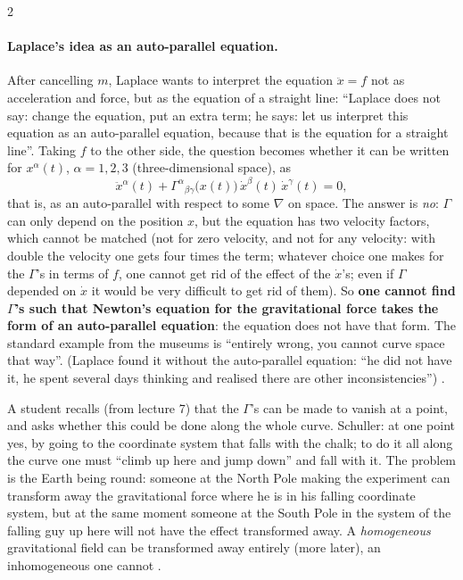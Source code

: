 \begin{paracol}{2}
\paragraph{Laplace's idea as an auto-parallel equation.} After cancelling $m$, Laplace wants to interpret the equation $\ddot x=f$ not as acceleration and force, but as the equation of a straight line: ``Laplace does not say: change the equation, put an extra term; he says: let us interpret this equation as an auto-parallel equation, because that is the equation for a straight line''. Taking $f$ to the other side, the question becomes whether it can be written for $x^\alpha(t)$, $\alpha=1,2,3$ (three-dimensional space), as
\[
  \ddot x^\alpha(t)+\Gamma^\alpha{}_{\beta\gamma}\bigl(x(t)\bigr)\,\dot x^\beta(t)\,\dot x^\gamma(t)=0,
\]
that is, as an auto-parallel with respect to some $\nabla$ on space. The answer is \emph{no}: $\Gamma$ can only depend on the position $x$, but the equation has two velocity factors, which cannot be matched (not for zero velocity, and not for any velocity: with double the velocity one gets four times the term; whatever choice one makes for the $\Gamma$'s in terms of $f$, one cannot get rid of the effect of the $\dot x$'s; even if $\Gamma$ depended on $\dot x$ it would be very difficult to get rid of them). So \textbf{one cannot find $\Gamma$'s such that Newton's equation for the gravitational force takes the form of an auto-parallel equation}: the equation does not have that form. The standard example from the museums is ``entirely wrong, you cannot curve space that way''. (Laplace found it without the auto-parallel equation: ``he did not have it, he spent several days thinking and realised there are other inconsistencies'')
.

\begin{coursenote}
A student recalls (from lecture 7) that the $\Gamma$'s can be made to vanish at a point, and asks whether this could be done along the whole curve. Schuller: at one point yes, by going to the coordinate system that falls with the chalk; to do it all along the curve one must ``climb up here and jump down'' and fall with it. The problem is the Earth being round: someone at the North Pole making the experiment can transform away the gravitational force where he is in his falling coordinate system, but at the same moment someone at the South Pole in the system of the falling guy up here will not have the effect transformed away. A \emph{homogeneous} gravitational field can be transformed away entirely (more later), an inhomogeneous one cannot
.
\end{coursenote}


\end{paracol}
